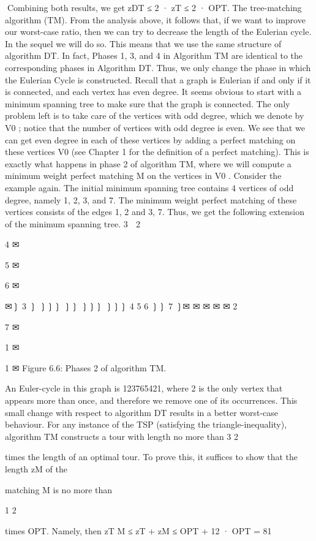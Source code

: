 Combining both results, we get zDT ≤ 2 · zT ≤ 2 · OPT.
The tree-matching algorithm (TM).
From the analysis above, it follows that, if we want to improve our worst-case ratio, then we can try to
decrease the length of the Eulerian cycle. In the sequel we will do so. This means that we use the same
structure of algorithm DT. In fact, Phases 1, 3, and 4 in Algorithm TM are identical to the corresponding
phases in Algorithm DT. Thus, we only change the phase in which the Eulerian Cycle is constructed.
Recall that a graph is Eulerian if and only if it is connected, and each vertex has even degree. It seems
obvious to start with a minimum spanning tree to make sure that the graph is connected. The only
problem left is to take care of the vertices with odd degree, which we denote by V0 ; notice that the
number of vertices with odd degree is even. We see that we can get even degree in each of these vertices
by adding a perfect matching on these vertices V0 (see Chapter 1 for the definition of a perfect matching).
This is exactly what happens in phase 2 of algorithm TM, where we will compute a minimum weight
perfect matching M on the vertices in V0 .
Consider the example again. The initial minimum spanning tree contains 4 vertices of odd degree, namely
1, 2, 3, and 7. The minimum weight perfect matching of these vertices consists of the edges {1, 2} and
{3, 7}. Thus, we get the following extension of the minimum spanning tree.
3 ✉
2 ✉

4
✉

5
✉

6
✉

✉❳
3 ❳
❳❳❳
❳❳
❳❳❳
❳❳❳
4
5
6 ❳❳ 7
❳✉
✉
✉
✉
✉
2

7
✉

1 ✉

1 ✉
Figure 6.6: Phases 2 of algorithm TM.

An Euler-cycle in this graph is 123765421, where 2 is the only vertex that appears more than once, and
therefore we remove one of its occurrences.
This small change with respect to algorithm DT results in a better worst-case behaviour. For any instance
of the TSP (satisfying the triangle-inequality), algorithm TM constructs a tour with length no more than
3
2

times the length of an optimal tour. To prove this, it suffices to show that the length zM of the

matching M is no more than

1
2

times OPT. Namely, then zT M ≤ zT + zM ≤ OPT + 12 · OPT =
81

